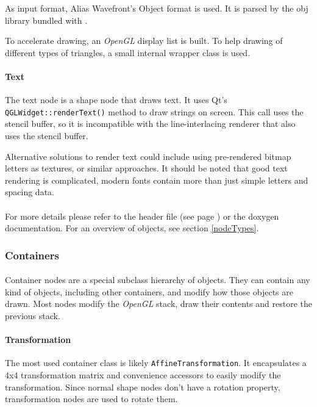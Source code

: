 As input format, Alias Wavefront's Object format is used.
It is parsed by the obj library bundled with \ER.

To accelerate drawing, an \textit{OpenGL} display list is built.
To help drawing of different types of triangles, a small internal wrapper class is used.

\paragraph{Text}
The text node is a shape node that draws text.
It uses Qt's \lstinline{QGLWidget::renderText()} method to draw strings on screen.
This call uses the stencil buffer, so it is incompatible with the line-interlacing renderer that also uses the stencil buffer.

Alternative solutions to render text could include using pre-rendered bitmap letters as textures, or similar approaches.
It should be noted that good text rendering is complicated, modern fonts contain more than just simple letters and spacing data.

\paragraph{}
For more details please refer to the header file (see page \pageref{object.h}) or the doxygen documentation.
For an overview of objects, see section \ref{nodeTypes}.

\subsubsection{Containers\label{ImplContainer}}
\paragraph{}
Container nodes are a special subclass hierarchy of objects.
They can contain any kind of objects, including other containers, and modify how those objects are drawn.
Most nodes modify the \textit{OpenGL} stack, draw their contents and restore the previous stack.

\paragraph{Transformation}
The most used container class is likely \lstinline{AffineTransformation}.
It encapsulates a 4x4 transformation matrix and convenience accessors to easily modify the transformation.
Since normal shape nodes don't have a rotation property, transformation nodes are used to rotate them.

